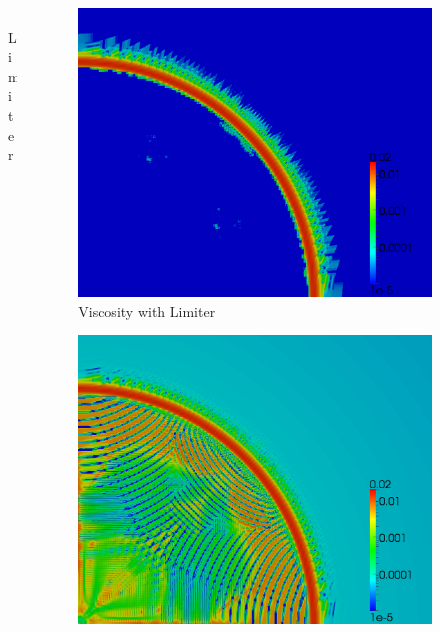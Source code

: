 \documentclass[8pt,xcolor=svgnames]{beamer}
\begin{document}
\begin{frame}
\begin{columns}
\begin{column}{0.3\textwidth}
\begin{figure}[t]
\begin{center}
\\Limiter
\end{center}
\end{figure}
\end{column}
\begin{column}{0.3\textwidth}
\begin{figure}[t]
\begin{center}
\includegraphics[height=0.9\textwidth]{figs/Noh/Q2l-7-viscosity.png}
\\Viscosity with Limiter
\end{center}
\end{figure}
\begin{figure}[t]
\begin{center}
\includegraphics[height=0.9\textwidth]{figs/Noh/Q2nl-7-viscosity.png}

\end{center}
\end{figure}
\end{column}
\end{columns}
\end{frame}
\end{document}
